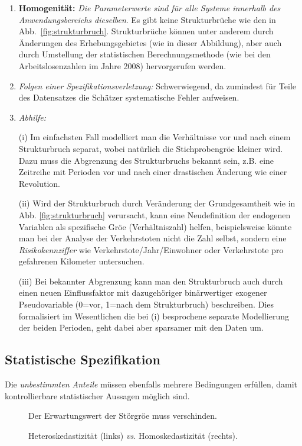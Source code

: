 \begin{enumerate}
\item \textbf{Homogenit\"at:} \emph{Die Parameterwerte sind f\"ur alle Systeme innerhalb des
Anwendungsbereichs dieselben}. 
Es gibt keine Strukturbr\"uche wie den in
Abb.~\ref{fig:strukturbruch}. Strukturbr\"uche k\"onnen unter anderem durch
\"Anderungen des Erhebungsgebietes (wie in dieser Abbildung), aber auch durch
Umstellung der statistischen Berechnungsmethode (wie bei den
Arbeitslosenzahlen im Jahre 2008) hervorgerufen werden. 

\bi
\item \textit{Folgen einer Spezifikationsverletzung:} Schwerwiegend,
  da zumindest f\"ur Teile des Datensatzes die Sch\"atzer
  systematische Fehler aufweisen.
\item \emph{Abhilfe:} 
\bi
\item[(i)] Im
einfachsten Fall modelliert man die Verh\"altnisse vor und nach einem
Strukturbruch separat, wobei nat\"urlich die Stichprobengr\"o\3e
kleiner wird. Dazu muss die Abgrenzung des Strukturbruchs bekannt
sein, z.B. eine
Zeitreihe mit Perioden vor und nach einer drastischen \"Anderung wie
einer Revolution.
\item[(ii)] Wird der Strukturbruch durch Ver\"anderung der
Grundgesamtheit wie in Abb. \ref{fig:strukturbruch} verursacht,
kann eine Neudefinition der endogenen Variablen als spezifische
Gr\"o\3e (Verh\"altniszahl) helfen, beispielsweise k\"onnte man bei der Analyse der
Verkehrstoten nicht die Zahl selbst, sondern eine
\emph{Risikokennziffer} wie Verkehrstote/Jahr/Einwohner oder
Verkehrstote pro gefahrenen Kilometer untersuchen.
\item[(iii)] Bei bekannter Abgrenzung kann man den Strukturbruch auch
durch einen neuen Einflussfaktor mit dazugeh\"origer bin\"arwertiger exogener
Pseudovariable (0=vor, 1=nach dem Strukturbruch) beschreiben. Dies
formalisiert im Wesentlichen die bei (i) besprochene separate
Modellierung der beiden Perioden, geht dabei aber sparsamer mit den
Daten um.
\ei
\ei

\end{enumerate}

\subsection{\label{sec:spezStat}Statistische Spezifikation}

Die \emph{unbestimmten Anteile} m\"ussen ebenfalls mehrere Bedingungen
erf\"ullen, damit kontrollierbare statistischer Aussagen m\"oglich
sind.
\begin{figure}
\caption{\label{fig:statSpezErw}Der Erwartungswert der St\"orgr\"o\3e
muss verschinden.}
\end{figure}
\begin{figure}
\caption{\label{fig:statSpezHomo}Heteroskedastizit\"at (links)
\textit{vs.} Homoskedastizit\"at (rechts).
}
\end{figure}

